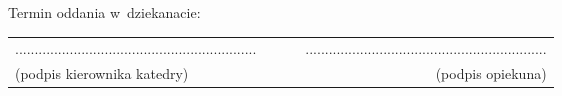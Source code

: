 \noindent
Termin oddania w~dziekanacie: \\[1cm]

\begin{center}
    \begin{tabular}{lcr}
        .............................................................. & ~~~ &
        ..............................................................                           \\
        (podpis kierownika katedry)                                    &     & (podpis opiekuna) \\
    \end{tabular}
\end{center}
